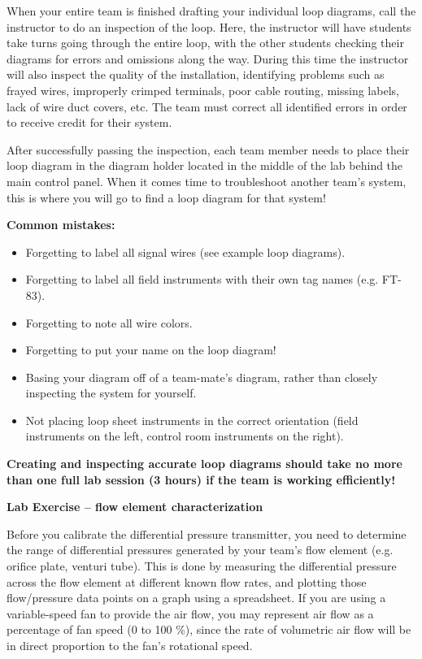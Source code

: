 When your entire team is finished drafting your individual loop diagrams, call the instructor to do an inspection of the loop.  Here, the instructor will have students take turns going through the entire loop, with the other students checking their diagrams for errors and omissions along the way.  During this time the instructor will also inspect the quality of the installation, identifying problems such as frayed wires, improperly crimped terminals, poor cable routing, missing labels, lack of wire duct covers, etc.  The team must correct all identified errors in order to receive credit for their system.  

After successfully passing the inspection, each team member needs to place their loop diagram in the diagram holder located in the middle of the lab behind the main control panel.  When it comes time to troubleshoot another team's system, this is where you will go to find a loop diagram for that system!

\vskip 10pt

{\bf Common mistakes:}

\begin{itemize}
\item{} Forgetting to label all signal wires (see example loop diagrams).
\item{} Forgetting to label all field instruments with their own tag names (e.g. FT-83).
\item{} Forgetting to note all wire colors.
\item{} Forgetting to put your name on the loop diagram!
\item{} Basing your diagram off of a team-mate's diagram, rather than closely inspecting the system for yourself.
\item{} Not placing loop sheet instruments in the correct orientation (field instruments on the left, control room instruments on the right).
\end{itemize}

\vskip 10pt

{\bf Creating and inspecting accurate loop diagrams should take no more than one full lab session (3 hours) if the team is working efficiently!}





\vfil \eject

\noindent
{\bf Lab Exercise -- flow element characterization}

\vskip 5pt

Before you calibrate the differential pressure transmitter, you need to determine the range of differential pressures generated by your team's flow element (e.g. orifice plate, venturi tube).  This is done by measuring the differential pressure across the flow element at different known flow rates, and plotting those flow/pressure data points on a graph using a spreadsheet.  If you are using a variable-speed fan to provide the air flow, you may represent air flow as a percentage of fan speed (0 to 100 \%), since the rate of volumetric air flow will be in direct proportion to the fan's rotational speed.

